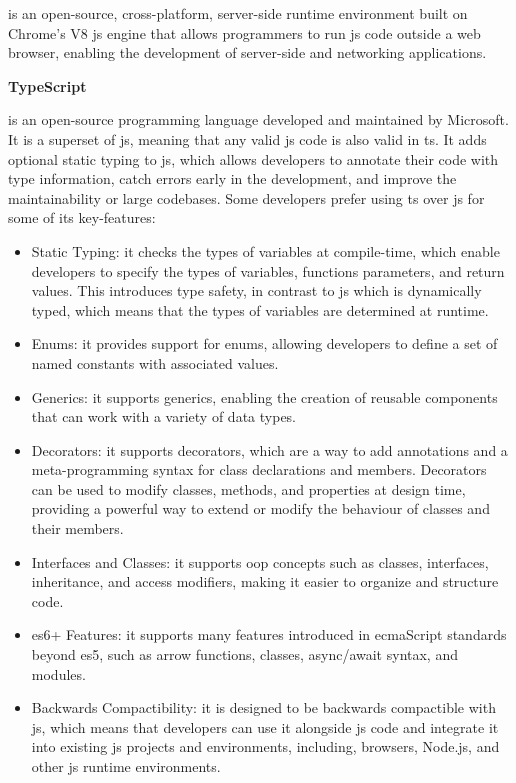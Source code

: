 \begin{multicols}{2}
      is an open-source, cross-platform, server-side runtime environment built on Chrome's V8 \acrshort{js} engine that allows
      programmers to run \acrshort{js} code outside a web browser, enabling the development of server-side and networking applications.

      \textbf{TypeScript}

      is an open-source programming language developed and maintained by Microsoft. It is a superset of \acrshort{js}, meaning that any valid
      \acrshort{js} code is also valid in \acrshort{ts}. It adds optional static typing to \acrshort{js}, which allows developers to
      annotate their code with type information, catch errors early in the development, and improve the maintainability or large codebases. Some
      developers prefer using \acrshort{ts} over \acrshort{js} for some of its key-features:
      \begin{itemize}
            \item Static Typing: it checks the types of variables at compile-time, which enable developers to specify the types of
                  variables, functions parameters, and return values. This introduces type safety, in contrast to \acrshort{js} which is
                  dynamically typed, which means that the types of variables are determined at runtime.
            \item Enums: it provides support for enums, allowing developers to define a set of named constants with associated values.
            \item Generics: it supports generics, enabling the creation of reusable components that can work with a variety of data types.
            \item Decorators: it supports decorators, which are a way to add annotations and a meta-programming syntax for class
                  declarations and  members. Decorators can be used to modify classes, methods, and properties at design time, providing a
                  powerful way to extend or modify the behaviour of classes and their members.
            \item Interfaces and Classes: it supports \acrshort{oop} concepts such as classes, interfaces, inheritance, and access modifiers,
                  making it easier to organize and structure code.
            \item \acrshort{es}6+ Features: it supports many features introduced in \acrshort{ecma}Script standards beyond \acrshort{es}5,
                  such as arrow functions, classes, async/await syntax, and modules.
            \item Backwards Compactibility: it is designed to be backwards compactible with \acrshort{js}, which means that developers can
                  use it alongside \acrshort{js} code and integrate it into existing \acrshort{js} projects and environments, including,
                  browsers, Node.js, and other \acrshort{js} runtime environments.
      \end{itemize}
\end{multicols}

